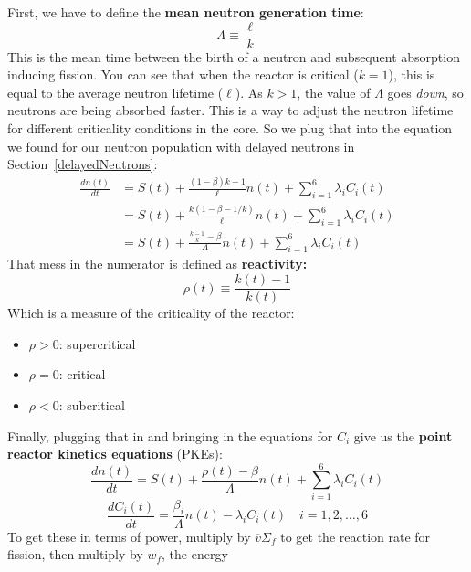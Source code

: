 \documentclass[letter]{article}
\begin{document}
\vspace{10pt}
First, we have to define the \textbf{mean neutron generation time}:
\begin{equation*}
  \Lambda \equiv \frac{\ell}{k}
\end{equation*}
This is the mean time between the birth of a neutron and subsequent
absorption inducing fission. You can see that when the reactor is
critical ($k=1$), this is equal to the average neutron lifetime
($\ell$). As $k>1$, the value of $\Lambda$ goes \textit{down}, so
neutrons are being absorbed faster. This is a way to adjust the
neutron lifetime for different criticality conditions in the core.
So we plug that into the equation we found for our neutron population
with delayed neutrons in Section~\ref{delayedNeutrons}:
\begin{equation*}
  \begin{split}
    \frac{dn(t)}{dt}&= S(t) +
    \frac{(1-\beta)k-1}{\ell}n(t)+\sum^6_{i=1}\lambda_iC_i(t) \\
    &= S(t) +
    \frac{k(1-\beta{}-1/k)}{\ell}n(t)+\sum^6_{i=1}\lambda_iC_i(t) \\
    &= S(t) + \frac{\frac{k-1}{k}-\beta}{\Lambda}n(t)+\sum^6_{i=1}\lambda_iC_i(t)
  \end{split}
\end{equation*}
That mess in the numerator is defined as \textbf{reactivity:}
\begin{equation*}
  \rho(t) \equiv \frac{k(t)-1}{k(t)}
\end{equation*}
Which is a measure of the criticality of the reactor:
\begin{itemize}
\item[] $\rho > 0$: supercritical
\item[] $\rho = 0$: critical
\item[] $\rho < 0$: subcritical
\end{itemize}
Finally, plugging that in and bringing in the equations for $C_i$ give
us the \textbf{point reactor kinetics equations} (PKEs):
\begin{equation*}
      \frac{dn(t)}{dt}= S(t) + \frac{\rho(t)-\beta}{\Lambda}n(t)+\sum^6_{i=1}\lambda_iC_i(t)
\end{equation*}
\begin{equation*}
    \frac{dC_i(t)}{dt}=\frac{\beta_i}{\Lambda}n(t)-\lambda_iC_i(t)\quad i=1,2,\ldots,6
\end{equation*}
To get these in terms of power, multiply by $\overline{v}\Sigma_f$ to
get the reaction rate for fission, then multiply by $w_f$, the energy
\end{document}
